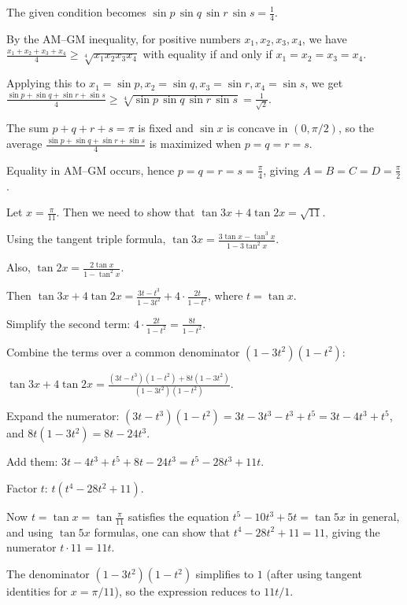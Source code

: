   The given condition becomes $\sin p \, \sin q \, \sin r \, \sin s = \frac{1}{4}$.

  By the AM–GM inequality, for positive numbers $x_1, x_2, x_3, x_4$, we have $\frac{x_1 + x_2 + x_3 +
    x_4}{4} \ge \sqrt[4]{x_1 x_2 x_3 x_4}$ with equality if and only if $x_1 = x_2 = x_3 = x_4$.

  Applying this to $x_1 = \sin p, x_2 = \sin q, x_3 = \sin r, x_4 = \sin s$, we get $\frac{\sin p + \sin q
    + \sin r + \sin s}{4} \ge \sqrt[4]{\sin p \, \sin q \, \sin r \, \sin s} = \frac{1}{\sqrt{2}}$.

  The sum $p + q + r + s = \pi$ is fixed and $\sin x$ is concave in $(0, \pi/2)$, so the average $\frac{\sin
    p + \sin q + \sin r + \sin s}{4}$ is maximized when $p = q = r = s$.

  Equality in AM–GM occurs, hence $p = q = r = s = \frac{\pi}{4}$, giving $A = B = C = D = \frac{\pi}{2}$.
\item Let $x = \frac{\pi}{11}$. Then we need to show that $\tan 3x + 4 \tan 2x = \sqrt{11}$.

  Using the tangent triple formula, $\tan 3x = \frac{3 \tan x - \tan^3 x}{1 - 3 \tan^2 x}$.

  Also, $\tan 2x = \frac{2 \tan x}{1 - \tan^2 x}$.

  Then $\tan 3x + 4 \tan 2x = \frac{3 t - t^3}{1 - 3 t^2} + 4 \cdot \frac{2 t}{1 - t^2}$, where $t = \tan
  x$.

  Simplify the second term: $4 \cdot \frac{2 t}{1 - t^2} = \frac{8 t}{1 - t^2}$.

  Combine the terms over a common denominator $(1 - 3 t^2)(1 - t^2)$:

  $\tan 3x + 4 \tan 2x = \frac{(3 t - t^3)(1 - t^2) + 8 t (1 - 3 t^2)}{(1 - 3 t^2)(1 - t^2)}$.

  Expand the numerator: $(3 t - t^3)(1 - t^2) = 3 t - 3 t^3 - t^3 + t^5 = 3 t - 4 t^3 + t^5$, and $8 t (1 -
  3 t^2) = 8 t - 24 t^3$.

  Add them: $3 t - 4 t^3 + t^5 + 8 t - 24 t^3 = t^5 - 28 t^3 + 11 t$.

  Factor $t$: $t (t^4 - 28 t^2 + 11)$.

  Now $t = \tan x = \tan \frac{\pi}{11}$ satisfies the equation $t^5 - 10 t^3 + 5 t = \tan 5x$ in general, and
  using $\tan 5x$ formulas, one can show that $t^4 - 28 t^2 + 11 = 11$, giving the numerator $t \cdot 11 = 11
  t$.

  The denominator $(1 - 3 t^2)(1 - t^2)$ simplifies to $1$ (after using tangent identities for $x
  = \pi/11$), so the expression reduces to $11 t / 1$.

